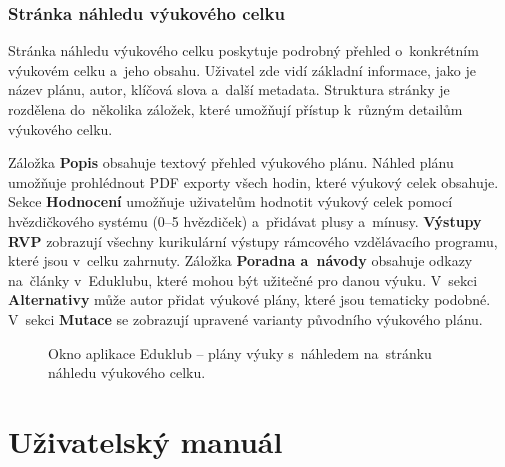 \documentclass[male,czech,api_bc]{kitheses}
\begin{document}
\subsubsection{Stránka náhledu výukového celku}

Stránka náhledu výukového celku poskytuje podrobný přehled o~konkrétním výukovém celku a~jeho obsahu. Uživatel zde vidí základní informace, jako je název plánu, autor, klíčová slova a~další metadata. Struktura stránky je rozdělena do~několika záložek, které umožňují přístup k~různým detailům výukového celku.

Záložka \textbf{Popis} obsahuje textový přehled výukového plánu. Náhled plánu umožňuje prohlédnout PDF exporty všech hodin, které výukový celek obsahuje. Sekce \textbf{Hodnocení} umožňuje uživatelům hodnotit výukový celek pomocí hvězdičkového systému (0--5 hvězdiček) a~přidávat plusy a~mínusy. \textbf{Výstupy RVP} zobrazují všechny kurikulární výstupy rámcového vzdělávacího programu, které jsou v~celku zahrnuty. Záložka \textbf{Poradna a~návody} obsahuje odkazy na~články v~Eduklubu, které mohou být užitečné pro danou výuku. V~sekci \textbf{Alternativy} může autor přidat výukové plány, které jsou tematicky podobné. V~sekci \textbf{Mutace} se zobrazují upravené varianty původního výukového plánu.

\begin{figure}[H]
	\centering
	\caption{Okno aplikace Eduklub – plány výuky s~náhledem na~stránku náhledu výukového celku.}
	\label{fig:eduklub-4}
\end{figure}

\section{Uživatelský manuál}
\end{document}
